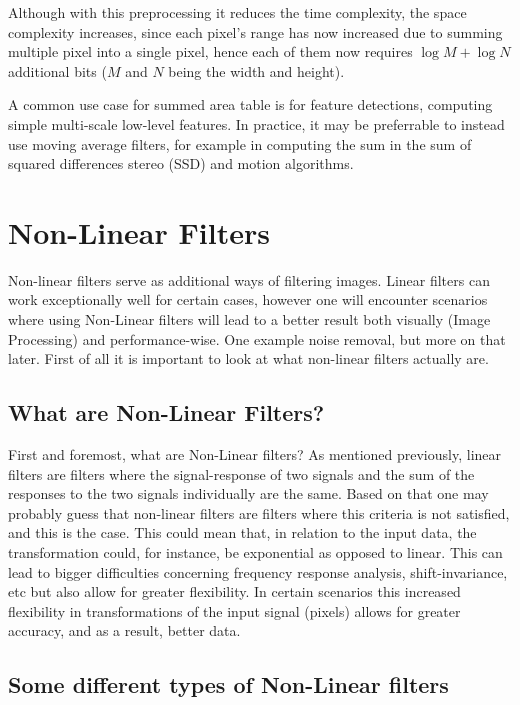 \documentclass[twoside,a4paper,article]{combine}
\begin{document}
Although with this preprocessing it reduces the time complexity, the space complexity increases, since each pixel's range has now increased due to summing multiple pixel into a single pixel,
hence each of them now requires $\log M + \log N$ additional bits ($M$ and $N$ being the width and height)\cite{Szeliski_2022}.

A common use case for summed area table is for feature detections, computing simple multi-scale low-level features. In practice, it may be preferrable to instead use 
moving average filters, for example in computing the sum in the sum of squared differences stereo (SSD) and motion algorithms\cite{Szeliski_2022}.\footnotemark{}


\section{Non-Linear Filters}
Non-linear filters serve as additional ways of filtering images. Linear filters can work exceptionally well for certain cases, however one will encounter scenarios where using Non-Linear filters will lead to a better result both visually (Image Processing) and performance-wise. One example noise removal, but more on that later. First of all it is important to look at what non-linear filters actually are.

\subsection{What are Non-Linear Filters?}
First and foremost, what are Non-Linear filters? As mentioned previously, linear filters are filters where the signal-response of two signals and the sum of the responses to the two signals individually are the same. Based on that one may probably guess that non-linear filters are filters where this criteria is not satisfied, and this is the case. This could mean that, in relation to the input data, the transformation could, for instance, be exponential as opposed to linear. This can lead to bigger difficulties concerning frequency response analysis,\cite[p.~132]{szeliski} shift-invariance, etc but also allow for greater flexibility. In certain scenarios this increased flexibility in transformations of the input signal (pixels) allows for greater accuracy, and as a result, better data.
\subsection{Some different types of Non-Linear filters}
\end{document}
